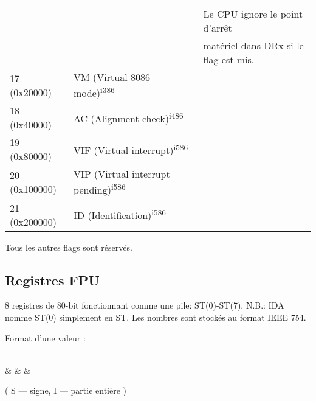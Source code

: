 \begin{center}
\begin{tabular}{ | l | l | l | }
             &                  & Le CPU ignore le point d'arrêt \\
	     &                  & matériel dans DRx si le flag est mis. \\
\hline
17 (0x20000) & VM (Virtual 8086 mode)\textsuperscript{i386} & \\
\hline
18 (0x40000) & AC (Alignment check)\textsuperscript{i486} & \\
\hline
19 (0x80000) & VIF (Virtual interrupt)\textsuperscript{i586} & \\
\hline
20 (0x100000) & VIP (Virtual interrupt pending)\textsuperscript{i586} & \\
\hline
21 (0x200000) & ID (Identification)\textsuperscript{i586} & \\
\hline
\end{tabular}
\end{center}
\normalsize

Tous les autres flags sont réservés.

\subsection{Registres FPU}

8 registres de 80-bit fonctionnant comme une pile: ST(0)-ST(7).
N.B.: \ac{IDA} nomme ST(0) simplement en ST.
Les nombres sont stockés au format IEEE 754.

Format d'une valeur :

\bigskip
\begin{center}
\begingroup
\makeatletter
\let\saved@bf@bitformatting\bf@bitformatting
\renewcommand*{\bf@bitformatting}{%
	\ifnum\value{header@val}=21 %
	\value{header@val}=62 %
	\else\ifnum\value{header@val}=22 %
	\value{header@val}=63 %
	\else\ifnum\value{header@val}=23 %
	\value{header@val}=64 %
	\else\ifnum\value{header@val}=30 %
	\value{header@val}=78 %
	\else\ifnum\value{header@val}=31 %
	\value{header@val}=79 %
	\fi\fi\fi\fi\fi
	\saved@bf@bitformatting
}%
\begin{bytefield}[bitwidth=0.03\linewidth]{32}
	 \\
	 &
	 &
	 &
\end{bytefield}
\endgroup
\end{center}

\begin{center}
( S --- signe, I --- partie entière )
\end{center}


